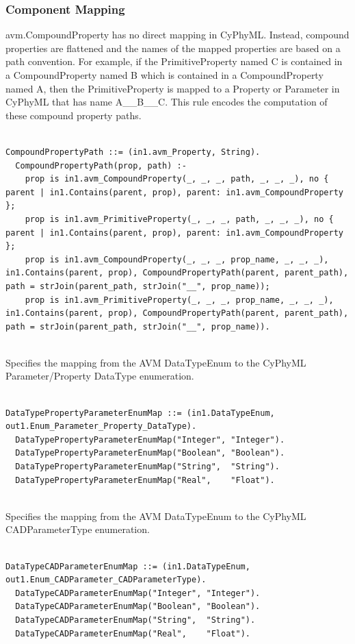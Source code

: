 \subsubsection{Component Mapping}


avm.CompoundProperty has no direct mapping in CyPhyML. Instead, compound properties are flattened and the names of the mapped properties are based on a path convention. For example, if the PrimitiveProperty named C is contained in a CompoundProperty named B which is contained in a CompoundProperty named A, then the PrimitiveProperty is mapped to a Property or Parameter in CyPhyML that has name A\_\_B\_\_C. This rule encodes the computation of these compound property paths.
\begin{lstlisting}

CompoundPropertyPath ::= (in1.avm_Property, String).
  CompoundPropertyPath(prop, path) :-
    prop is in1.avm_CompoundProperty(_, _, _, path, _, _, _), no { parent | in1.Contains(parent, prop), parent: in1.avm_CompoundProperty };
    prop is in1.avm_PrimitiveProperty(_, _, _, path, _, _, _), no { parent | in1.Contains(parent, prop), parent: in1.avm_CompoundProperty };
    prop is in1.avm_CompoundProperty(_, _, _, prop_name, _, _, _), in1.Contains(parent, prop), CompoundPropertyPath(parent, parent_path), path = strJoin(parent_path, strJoin("__", prop_name));
    prop is in1.avm_PrimitiveProperty(_, _, _, prop_name, _, _, _), in1.Contains(parent, prop), CompoundPropertyPath(parent, parent_path), path = strJoin(parent_path, strJoin("__", prop_name)).


\end{lstlisting}

Specifies the mapping from the AVM DataTypeEnum to the CyPhyML Parameter/Property DataType enumeration.
\begin{lstlisting}

DataTypePropertyParameterEnumMap ::= (in1.DataTypeEnum, out1.Enum_Parameter_Property_DataType).
  DataTypePropertyParameterEnumMap("Integer", "Integer").
  DataTypePropertyParameterEnumMap("Boolean", "Boolean").
  DataTypePropertyParameterEnumMap("String",  "String").
  DataTypePropertyParameterEnumMap("Real",    "Float").


\end{lstlisting}

Specifies the mapping from the AVM DataTypeEnum to the CyPhyML CADParameterType enumeration.
\begin{lstlisting}

DataTypeCADParameterEnumMap ::= (in1.DataTypeEnum, out1.Enum_CADParameter_CADParameterType).
  DataTypeCADParameterEnumMap("Integer", "Integer").
  DataTypeCADParameterEnumMap("Boolean", "Boolean").
  DataTypeCADParameterEnumMap("String",  "String").
  DataTypeCADParameterEnumMap("Real",    "Float").


\end{lstlisting}

